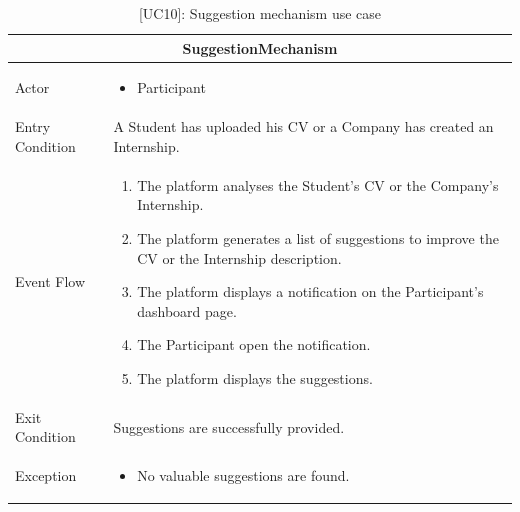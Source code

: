 \begin{table}[H]
    \centering
    \begin{tabular}{|p{3cm}|p{12cm}|}
    \hline
    \multicolumn{2}{|c|}{\textbf{SuggestionMechanism}} \\ \hline
    Actor & 
    \begin{itemize}
        \item Participant
    \end{itemize}\\ \hline
    Entry Condition & A Student has uploaded his CV or a Company has created an Internship.\\ \hline
    Event Flow & 
    \begin{enumerate}         
        \item The platform analyses the Student's CV or the Company's Internship.
        \item The platform generates a list of suggestions to improve the CV or the Internship description.
        \item The platform displays a notification on the Participant's dashboard page.
        \item The Participant open the notification.
        \item The platform displays the suggestions.
    \end{enumerate} \\ \hline
    Exit Condition & Suggestions are successfully provided. \\ \hline
    Exception & 
    \begin{itemize}        
        \item No valuable suggestions are found.  
    \end{itemize} \\ \hline
    \end{tabular}
    \caption{[UC10]: Suggestion mechanism use case}
    \label{tab:UC10}
\end{table}

